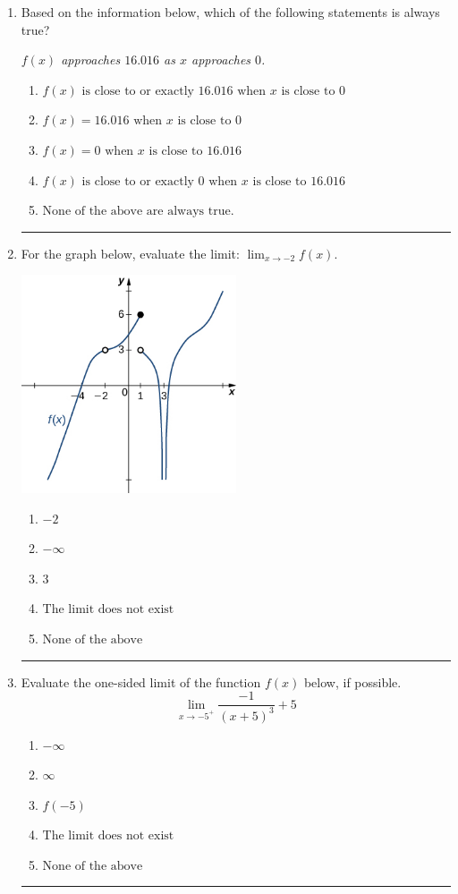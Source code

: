 \documentclass[14pt]{extbook}
\newcommand{\litem}[1]{\item#1\hspace*{-1cm}\rule{\textwidth}{0.4pt}}
\begin{document}
\begin{enumerate}
{\begin{enumerate}[label=\Alph*.]
\end{enumerate} }
\litem{
Based on the information below, which of the following statements is always true?
\begin{center}
    \textit{ $f(x)$ approaches $16.016$ as $x$ approaches $0$. }
\end{center}
\begin{enumerate}[label=\Alph*.]
\item \( f(x) \text{ is close to or exactly } 16.016 \text{ when } x \text{ is close to } 0 \)
\item \( f(x) = 16.016 \text{ when } x \text{ is close to } 0 \)
\item \( f(x) = 0 \text{ when } x \text{ is close to } 16.016 \)
\item \( f(x) \text{ is close to or exactly } 0 \text{ when } x \text{ is close to } 16.016 \)
\item \( \text{None of the above are always true.} \)

\end{enumerate} }
\litem{
For the graph below, evaluate the limit: $ \displaystyle \lim_{x \rightarrow -2} f(x)$.
\begin{center}
    \includegraphics[width=0.5\textwidth]{../Figures/evaluateLimitGraphicallyCopyA.png}
\end{center}
\begin{enumerate}[label=\Alph*.]
\item \( -2 \)
\item \( -\infty \)
\item \( 3 \)
\item \( \text{The limit does not exist} \)
\item \( \text{None of the above} \)

\end{enumerate} }
\litem{
Evaluate the one-sided limit of the function $f(x)$ below, if possible.\[ \lim_{x \rightarrow -5^+} \frac{-1}{(x+5)^3}+5 \]\begin{enumerate}[label=\Alph*.]
\item \( -\infty \)
\item \( \infty \)
\item \( f(-5) \)
\item \( \text{The limit does not exist} \)
\item \( \text{None of the above} \)


\end{enumerate}}
\end{enumerate}
\end{document}
